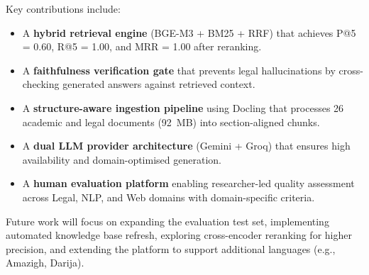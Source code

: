 \documentclass[12pt, a4paper]{article}
\begin{document}
Key contributions include:
\begin{itemize}[leftmargin=2em]
  \item A \textbf{hybrid retrieval engine} (BGE-M3 + BM25 + RRF) that
        achieves P@5 = 0.60, R@5 = 1.00, and MRR = 1.00 after reranking.
  \item A \textbf{faithfulness verification gate} that prevents legal
        hallucinations by cross-checking generated answers against
        retrieved context.
  \item A \textbf{structure-aware ingestion pipeline} using Docling that
        processes 26 academic and legal documents (92~MB) into
        section-aligned chunks.
  \item A \textbf{dual LLM provider architecture} (Gemini + Groq) that
        ensures high availability and domain-optimised generation.
  \item A \textbf{human evaluation platform} enabling researcher-led
        quality assessment across Legal, NLP, and Web domains with
        domain-specific criteria.
\end{itemize}

Future work will focus on expanding the evaluation test set, implementing
automated knowledge base refresh, exploring cross-encoder reranking for
higher precision, and extending the platform to support additional
languages (e.g., Amazigh, Darija).
\end{document}
